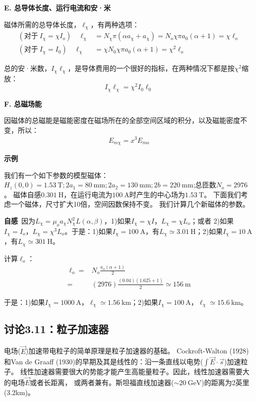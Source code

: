 \textbf{E. 总导体长度、运行电流和安·米}

磁体所需的总导体长度，$\ell_\chi$，有两种选项：
\begin{subequations}
	\begin{align}
(\mbox{对于}\ I_{\chi}=\chi I_{o})\quad \ell_{\chi}&=N_{\chi} \pi (\alpha a_\chi+a_\chi)=N_{o}\chi \pi a_0(\alpha+1)=\chi \ell_{o}\\%
(\mbox{对于}\ I_{\chi}=I_0)\quad \ell_{\chi}&=\chi N_0 \chi \pi a_0 (\alpha+1)=\chi^2 \ell_{o}%
	\end{align}
\end{subequations}

总的安·米数，$I_\chi \ell_\chi$，是导体费用的一个很好的指标，在两种情况下都是按$\chi^2$缩放：
\begin{equation}
I_\chi \ell_\chi=\chi^2 I_0 \ell_0 %
\end{equation}

\textbf{F. 总磁场能}

因磁体的总磁能是磁能密度在磁场所在的全部空间区域的积分，以及磁能密度不变，所以：
\begin{align*}
E_{m\chi}=x^3E_{mo}
\end{align*}

\textbf{示例}

我们有一个如下参数的模型磁体：$H_z(0, 0) = 1.53\ \mathrm{T}; 2a_1 =
80\ \mathrm{mm}; 2a_2 = 130\ \mathrm{mm}; 2b = 220\ \mathrm{mm}$;总匝数$N_o = 2976$。
磁体自感$0.301\ \mathrm{H}$，在运行电流为$100\ \mathrm{A}$时产生的中心场为$1.53\ \mathrm{T}$。
下面我们考虑一个磁体，尺寸扩大10倍，空间因数保持不变。
我们计算几个新磁体的参数。

\textbf{自感}\ 因为$L_\chi=\mu_o a_\chi N_\chi^2L(\alpha,\beta)$，1)如果$I_\chi=\chi I$，$L_\chi=\chi L_o$；或者
2)如果$I_\chi=I_o$，$L_\chi=\chi^3L_o$。于是：1)如果$I_\chi=100\ \mathrm{A}$，有$L_\chi\simeq 3.01\ \mathrm{H}$；2)如果$I_\chi=10\ \mathrm{A}$，有$L_\chi\simeq 301\ \mathrm{H}$。

计算$\ell_o$：
\begin{align*}
\ell_{o}=&N_{o}\frac{a_{o}(\alpha+1)}{2}\\
=&(2976)\frac{(0.04)(1.625+1)}{2}\simeq 156\ \mathrm{m}
\end{align*}

于是：1)如果$I_\chi=1000\ \mathrm{A}$，$\ell_{\chi}\simeq 1.56\ \mathrm{km}$；2)如果$I_\chi=100\ \mathrm{A}$，$\ell_{\chi}\simeq 15.6\ \mathrm{km}$。 



\subsection{讨论3.11：粒子加速器}
电场($\vec{E}$)加速带电粒子的简单原理是粒子加速器的基础。
Cockroft-Walton (1928)和Van de Graaff (1930)的早期及其是线性的：沿一条直线以电势($\int\vec{E}\cdot\vec{s}$)加速粒子。
线性加速器需要很大的势能才能产生高能量粒子。因此，线性加速器需要大的电场$\vec{E}$或者长距离，
或两者兼有。斯坦福直线加速器($\sim 20\ \mathrm{GeV} $)的距离为2英里(3.2km)。

